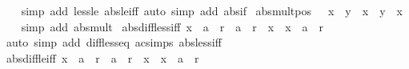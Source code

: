 \begin{isabellebody}
%
\isadelimproof
\ \ %
\endisadelimproof
%
\isatagproof
{}\isamarkupfalse%
\ {\isacharparenleft}{\kern0pt}simp\ add{\isacharcolon}{\kern0pt}\ less{\isacharunderscore}{\kern0pt}le\ abs{\isacharunderscore}{\kern0pt}le{\isacharunderscore}{\kern0pt}iff{\isacharparenright}{\kern0pt}\ {\isacharparenleft}{\kern0pt}auto\ simp\ add{\isacharcolon}{\kern0pt}\ abs{\isacharunderscore}{\kern0pt}if{\isacharparenright}{\kern0pt}%
\endisatagproof
{\isafoldproof}%
%
\isadelimproof
\isanewline
%
\endisadelimproof
\isanewline
{}\isamarkupfalse%
\ abs{\isacharunderscore}{\kern0pt}mult{\isacharunderscore}{\kern0pt}pos{\isacharcolon}{\kern0pt}\ {\isachardoublequoteopen}{}\ {\isasymle}\ x\ {\isasymLongrightarrow}\ {\isasymbar}y{\isasymbar}\ {\isacharasterisk}{\kern0pt}\ x\ {\isacharequal}{\kern0pt}\ {\isasymbar}y\ {\isacharasterisk}{\kern0pt}\ x{\isasymbar}{\isachardoublequoteclose}\isanewline
%
\isadelimproof
\ \ %
\endisadelimproof
%
\isatagproof
{}\isamarkupfalse%
\ {\isacharparenleft}{\kern0pt}simp\ add{\isacharcolon}{\kern0pt}\ abs{\isacharunderscore}{\kern0pt}mult{\isacharparenright}{\kern0pt}%
\endisatagproof
{\isafoldproof}%
%
\isadelimproof
\isanewline
%
\endisadelimproof
\isanewline
{}\isamarkupfalse%
\ abs{\isacharunderscore}{\kern0pt}diff{\isacharunderscore}{\kern0pt}less{\isacharunderscore}{\kern0pt}iff{\isacharcolon}{\kern0pt}\ {\isachardoublequoteopen}{\isasymbar}x\ {\isacharminus}{\kern0pt}\ a{\isasymbar}\ {\isacharless}{\kern0pt}\ r\ {\isasymlongleftrightarrow}\ a\ {\isacharminus}{\kern0pt}\ r\ {\isacharless}{\kern0pt}\ x\ {\isasymand}\ x\ {\isacharless}{\kern0pt}\ a\ {\isacharplus}{\kern0pt}\ r{\isachardoublequoteclose}\isanewline
%
\isadelimproof
\ \ %
\endisadelimproof
%
\isatagproof
{}\isamarkupfalse%
\ {\isacharparenleft}{\kern0pt}auto\ simp\ add{\isacharcolon}{\kern0pt}\ diff{\isacharunderscore}{\kern0pt}less{\isacharunderscore}{\kern0pt}eq\ ac{\isacharunderscore}{\kern0pt}simps\ abs{\isacharunderscore}{\kern0pt}less{\isacharunderscore}{\kern0pt}iff{\isacharparenright}{\kern0pt}%
\endisatagproof
{\isafoldproof}%
%
\isadelimproof
\isanewline
%
\endisadelimproof
\isanewline
{}\isamarkupfalse%
\ abs{\isacharunderscore}{\kern0pt}diff{\isacharunderscore}{\kern0pt}le{\isacharunderscore}{\kern0pt}iff{\isacharcolon}{\kern0pt}\ {\isachardoublequoteopen}{\isasymbar}x\ {\isacharminus}{\kern0pt}\ a{\isasymbar}\ {\isasymle}\ r\ {\isasymlongleftrightarrow}\ a\ {\isacharminus}{\kern0pt}\ r\ {\isasymle}\ x\ {\isasymand}\ x\ {\isasymle}\ a\ {\isacharplus}{\kern0pt}\ r{\isachardoublequoteclose}\isanewline

\end{isabellebody}
